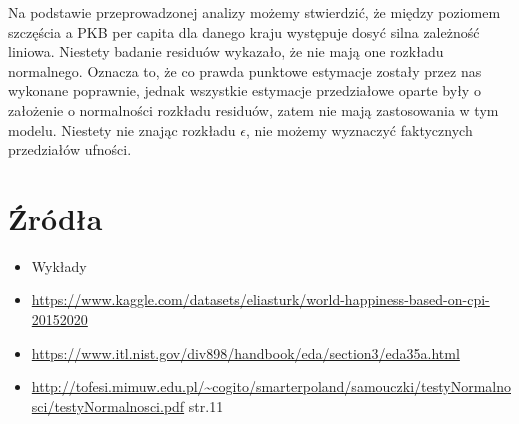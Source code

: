 \documentclass{article}
\theoremstyle{break}
\begin{document}
Na podstawie przeprowadzonej analizy możemy stwierdzić, że między poziomem szczęścia a PKB per capita dla danego kraju występuje dosyć silna zależność liniowa. Niestety badanie residuów wykazało, że nie mają one rozkładu normalnego. Oznacza to, że co prawda punktowe estymacje zostały przez nas wykonane poprawnie, jednak wszystkie estymacje przedziałowe oparte były o założenie o normalności rozkładu residuów, zatem nie mają zastosowania w tym modelu. Niestety nie znając rozkładu $\epsilon$, nie możemy wyznaczyć faktycznych przedziałów ufności.
	
	\section{Źródła}
	\begin{itemize}
		\item Wykłady
		\item \url{https://www.kaggle.com/datasets/eliasturk/world-happiness-based-on-cpi-20152020}
		\item \url{https://www.itl.nist.gov/div898/handbook/eda/section3/eda35a.html}
		\item \url{http://tofesi.mimuw.edu.pl/~cogito/smarterpoland/samouczki/testyNormalnosci/testyNormalnosci.pdf} str.11
		
	\end{itemize}
	
	
\end{document}
